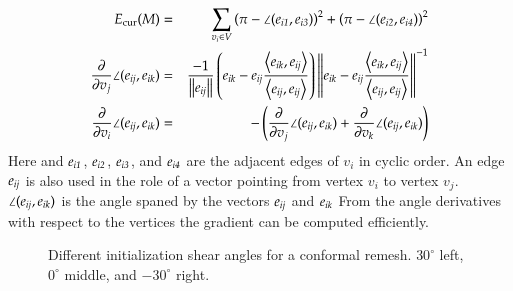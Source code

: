\documentclass[Thesis.tex]{subfiles}
\begin{document}
\begin{eqnarray*}
	E_{\textrm{\scriptsize{cur}}}(M) &=& \sum_{v_i\in V} \left(\pi - \angle(e_{\mathrm{\it{i1}}}, e_{\mathrm{\it{i3}}}) \right)^2 
	+ \left(\pi - \angle(e_{\mathrm{\it{i2}}}, e_{\mathrm{\it{i4}}}) \right)^2 \\
	\frac{\partial}{\partial v_j}\angle(e_{\mathrm{\it{ij}}},e_{\mathrm{\it{ik}}}) &=& 
	\frac{-1}{\left\Vert e_{\mathrm{\it{ij}}}\right\Vert}\left(e_{\mathrm{\it{ik}}}-e_{\mathrm{\it{ij}}}\frac{\left<e_{\mathrm{\it{ik}}},e_{\mathrm{\it{ij}}}\right>}{\left<e_{\mathrm{\it{ij}}},e_{\mathrm{\it{ij}}}\right>}\right)
	\left\Vert e_{\mathrm{\it{ik}}}-e_{\mathrm{\it{ij}}}\frac{\left<e_{\mathrm{\it{ik}}},e_{\mathrm{\it{ij}}}\right>}		
	{\left<e_{\mathrm{\it{ij}}},e_{\mathrm{\it{ij}}}\right>} \right\Vert^{-1} \\
	\frac{\partial}{\partial v_i}\angle(e_{\mathrm{\it{ij}}},e_{\mathrm{\it{ik}}}) &=& 
	- \left(\frac{\partial}{\partial v_j}\angle(e_{\mathrm{\it{ij}}},e_{\mathrm{\it{ik}}}) + 
	\frac{\partial}{\partial v_k}\angle(e_{\mathrm{\it{ij}}},e_{\mathrm{\it{ik}}})\right)
\end{eqnarray*}
Here and $e_{\mathrm{\it{i1}}}$, $e_{\mathrm{\it{i2}}}$, $e_{\mathrm{\it{i3}}}$, and $e_{\mathrm{\it{i4}}}$ are the adjacent edges of $v_i$ in cyclic order. An edge $e_{\mathrm{\it{ij}}}$ is also used in the role of a vector pointing from vertex $v_i$ to vertex $v_j$. $\angle(e_{\mathrm{\it{ij}}},e_{\mathrm{\it{ik}}})$ is the angle spaned by the vectors $e_{\mathrm{\it{ij}}}$ and $e_{\mathrm{\it{ik}}}$  From the angle derivatives with respect to the vertices the gradient can be computed efficiently.

\begin{figure}
\centering
{}
\caption{Different initialization shear angles for a conformal remesh. $30^\circ$ left, $0^\circ$ middle, and $-30^\circ$ right.}
\label{fig:initial_grids}
\end{figure}
\end{document}
